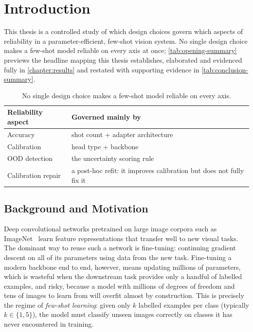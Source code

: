 \documentclass{iutbscthesis}
\begin{document}
\begin{abstract}
\end{abstract}


\chapter{Introduction}
\label{chapter:introduction}

This thesis is a controlled study of which design choices govern which aspects of reliability in a parameter-efficient, few-shot vision system. No single design choice makes a few-shot model reliable on every axis at once; \autoref{tab:opening-summary} previews the headline mapping this thesis establishes, elaborated and evidenced fully in \autoref{chapter:results} and restated with supporting evidence in \autoref{tab:conclusion-summary}.

\begin{table}[H]
    \centering
    \small
    \begin{tabular}{l >{\raggedright\arraybackslash}p{9.5cm}}
        \toprule
        Reliability aspect & Governed mainly by \\
        \midrule
        Accuracy & shot count + adapter architecture \\
        Calibration & head type + backbone \\
        OOD detection & the uncertainty scoring rule \\
        Calibration repair & a post-hoc refit: it improves calibration but does not fully fix it \\
        \bottomrule
    \end{tabular}
    \caption{No single design choice makes a few-shot model reliable on every axis.}
    \label{tab:opening-summary}
\end{table}

\section{Background and Motivation}

Deep convolutional networks pretrained on large image corpora such as ImageNet~\cite{deng2009imagenet} learn feature representations that transfer well to new visual tasks. The dominant way to reuse such a network is fine-tuning: continuing gradient descent on all of its parameters using data from the new task. Fine-tuning a modern backbone end to end, however, means updating millions of parameters, which is wasteful when the downstream task provides only a handful of labelled examples, and risky, because a model with millions of degrees of freedom and tens of images to learn from will overfit almost by construction. This is precisely the regime of \emph{few-shot learning}: given only $k$ labelled examples per class (typically $k \in \{1, 5\}$), the model must classify unseen images correctly on classes it has never encountered in training.
\end{document}
